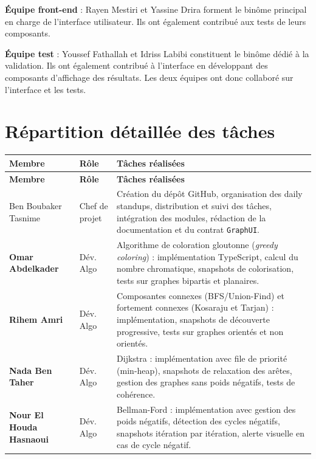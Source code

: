 \documentclass[a4paper,12pt]{report}
\begin{document}
\textbf{Équipe front-end} : Rayen Mestiri et Yassine Drira forment le binôme principal en
charge de l'interface utilisateur. Ils ont également contribué aux tests de leurs composants.

\textbf{Équipe test} : Youssef Fathallah et Idriss Labibi constituent le binôme dédié à la
validation. Ils ont également contribué à l'interface en développant des composants d'affichage
des résultats. Les deux équipes ont donc collaboré sur l'interface et les tests.

\section{Répartition détaillée des tâches}

\renewcommand{\arraystretch}{1.4}
\begin{longtable}{>{\bfseries}p{3.6cm} p{2.8cm} p{7.2cm}}
\rowcolor{headerblue}
\color{white}\textbf{Membre} & \color{white}\textbf{Rôle} & \color{white}\textbf{Tâches réalisées} \\
\hline
\endfirsthead
\rowcolor{headerblue}
\color{white}\textbf{Membre} & \color{white}\textbf{Rôle} & \color{white}\textbf{Tâches réalisées} \\
\hline
\endhead

\rowcolor{teal100}
Ben Boubaker Tasnime & Chef de projet &
Création du dépôt GitHub, organisation des daily standups, distribution et suivi des tâches,
intégration des modules, rédaction de la documentation et du contrat \texttt{GraphUI}. \\

Omar Abdelkader & Dév. Algo &
Algorithme de coloration gloutonne (\textit{greedy coloring}) : implémentation TypeScript, calcul du nombre chromatique, snapshots de colorisation, tests sur graphes bipartis et planaires. \\

\rowcolor{teal100}
Rihem Amri & Dév. Algo &
Composantes connexes (BFS/Union-Find) et fortement connexes (Kosaraju et Tarjan) : implémentation, snapshots de découverte progressive, tests sur graphes orientés et non orientés. \\

Nada Ben Taher & Dév. Algo &
Dijkstra : implémentation avec file de priorité (min-heap), snapshots de relaxation des arêtes, gestion des graphes sans poids négatifs, tests de cohérence. \\

\rowcolor{teal100}
Nour El Houda Hasnaoui & Dév. Algo &
Bellman-Ford : implémentation avec gestion des poids négatifs, détection des cycles négatifs, snapshots itération par itération, alerte visuelle en cas de cycle négatif. \\


\end{longtable}
\end{document}
